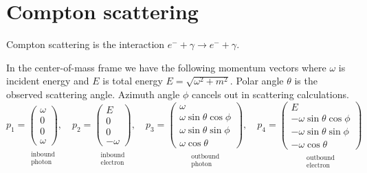 

\section*{Compton scattering}
Compton scattering is the interaction $e^-+\gamma\rightarrow e^-+\gamma$.

\begin{center}
\end{center}

In the center-of-mass frame we have the following momentum vectors
where $\omega$ is incident energy and
$E$ is total energy $E=\sqrt{\omega^2+m^2}$.
Polar angle $\theta$ is the observed scattering angle.
Azimuth angle $\phi$ cancels out in scattering calculations.
\begin{equation*}
p_1=\underset{\substack{\\ \text{inbound}\\ \text{photon}}}
{\begin{pmatrix}\omega\\0\\0\\ \omega\end{pmatrix}},
\quad
p_2=\underset{\substack{\\ \text{inbound}\\ \text{electron}}}
{\begin{pmatrix}E\\0\\0\\-\omega\end{pmatrix}},
\quad
p_3=\underset{\substack{\\ \text{outbound}\\ \text{photon}}}
{\begin{pmatrix}
\omega\\
\omega\sin\theta\cos\phi\\
\omega\sin\theta\sin\phi\\
\omega\cos\theta
\end{pmatrix}},
\quad
p_4=\underset{\substack{\\ \text{outbound}\\ \text{electron}}}
{\begin{pmatrix}
E\\
-\omega\sin\theta\cos\phi\\
-\omega\sin\theta\sin\phi\\
-\omega\cos\theta
\end{pmatrix}}
\end{equation*}

